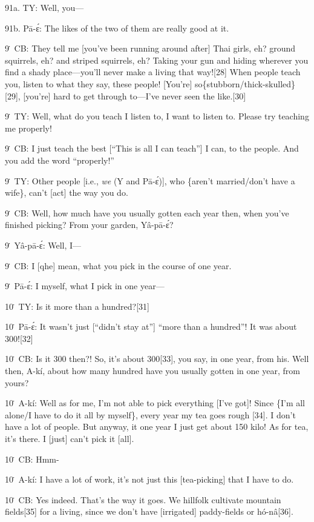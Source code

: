 91a. TY: Well, you---

91b. Pā-ɛ́: The likes of the two of them are really good at it.

9\. CB: They tell me [you've been running around after] Thai girls, eh? ground
squirrels, eh? and striped squirrels, eh? Taking your gun and hiding wherever you
find a shady place---you'll never make a living that way![28]  When people teach
you, listen to what they say, these people!  [You're] so\{stubborn/thick-skulled\}[29],
[you're] hard to get through to---I've never seen the like.[30]

9\. TY: Well, what do you teach I listen to, I want to listen to.  Please try teaching
me properly!

9\. CB: I just teach the best [``This is all I can teach''] I can, to the people.
And you add the word ``properly!''

9\. TY: Other people [i.e., \textit{we} (Y and Pā-ɛ́)], who \{aren't married/don't
have a wife\}, can't [act] the way you do.

9\. CB: Well, how much have you usually gotten each year then, when you've finished
picking?  From your garden, Yâ-pā-ɛ́?

9\. Yâ-pā-ɛ́: Well, I---

9\. CB: I [qhe] mean, what you pick in the course of one year.

9\. Pā-ɛ́: I myself, what I pick in one year---

10\. TY: Is it more than a hundred?[31]

10\. Pā-ɛ́: It wasn't just [``didn't stay at''] ``more than a hundred''!  It
was about 300![32]

10\. CB: Is it 300 then?!  So, it's about 300[33], you say, in one year, from his.
Well then, A-kí, about how many hundred have you usually gotten in one year,
from yours?

10\. A-kí: Well as for me, I'm not able to pick everything [I've got]!  Since
\{I'm all alone/I have to do it all by myself\}, every year my tea goes rough [34].
I don't have a lot of people.  But anyway, it one year I just get about 150 kilo!
As for tea, it's there.  I [just] can't pick it [all].

10\. CB: Hmm-

10\. A-kí: I have a lot of work, it's not just this [tea-picking] that I have
to do.

10\. CB: Yes indeed.  That's the way it goes.  We hillfolk cultivate mountain fields[35]
for a living, since we don't have [irrigated] paddy-fields or hó-nâ[36].

